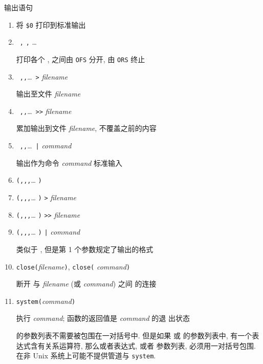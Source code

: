 \begin{summary}{输出语句}
    \begin{enumerate}
        \item \print \par
            将 \verb'$0' 打印到标准输出
        \item \print\ \expr\verb',' \expr\verb',' \ldots \par
            打印各个 \expr, \expr 之间由 \verb'OFS' 分开, 由 \verb'ORS'
            终止
        \item \print\ \expr\verb','\expr\verb','\ldots\ \verb'>'
            \textit{filename}
            \par 输出至文件 \textit{filename}
        \item \print\ \expr\verb','\expr\verb','\ldots\ \verb'>>'
            \textit{filename}
            \par 累加输出到文件 \textit{filename}, 不覆盖之前的内容
        \item \print\ \expr\verb','\expr\verb','\ldots\ \verb'|'
            \textit{command} \par
            输出作为命令 \textit{command} 标准输入
        \item
            \printf\verb'('\fmt\verb','\expr\verb','\expr\verb','\ldots
            \verb')'
        \item
            \printf\verb'('\fmt\verb','\expr\verb','\expr\verb','\ldots
            \verb')' \verb'>' \textit{filename}
        \item
            \printf\verb'('\fmt\verb','\expr\verb','\expr\verb','\ldots
            \verb')' \verb'>>' \textit{filename}
        \item
            \printf\verb'('\fmt\verb','\expr\verb','\expr\verb','\ldots
            \verb')' \verb'|' \textit{command} \par
            \printf 类似于 \print, 但是第 1 个参数规定了输出的格式
        \item \verb'close('\textit{filename}\verb')', \verb'close('
            \textit{command}\verb')' \par
            断开 \print 与 \textit{filename} (或 \textit{command}) 之间
            的连接
        \item \verb'system('\textit{command}\verb')' \par
            执行 \textit{command}; 函数的返回值是 \textit{command} 的退
            出状态

        \printf 的参数列表不需要被包围在一对括号中. 但是如果 \print 或
        \printf 的参数列表中, 有一个表达式含有关系运算符, 那么或者表达式,
        或者
        参数列表, 必须用一对括号包围. 在非 Unix 系统上可能不提供管道与
        \verb'system'.
    \end{enumerate}
\end{summary}

